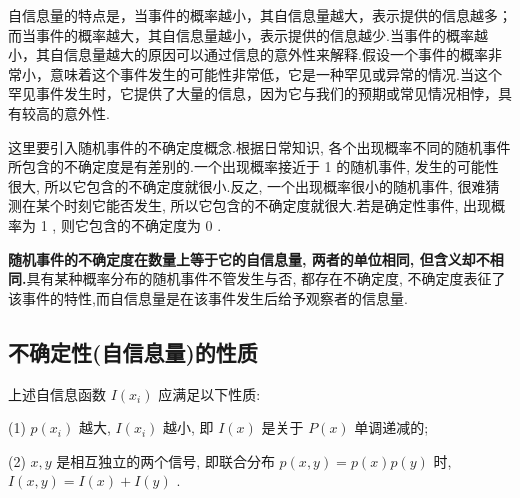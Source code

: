     自信息量的特点是，当事件的概率越小，其自信息量越大，表示提供的信息越多；而当事件的概率越大，其自信息量越小，表示提供的信息越少.当事件的概率越小，其自信息量越大的原因可以通过信息的意外性来解释.假设一个事件的概率非常小，意味着这个事件发生的可能性非常低，它是一种罕见或异常的情况.当这个罕见事件发生时，它提供了大量的信息，因为它与我们的预期或常见情况相悖，具有较高的意外性.


这里要引入随机事件的不确定度概念.根据日常知识, 各个出现概率不同的随机事件所包含的不确定度是有差别的.一个出现概率接近于 1 的随机事件, 发生的可能性很大, 所以它包含的不确定度就很小.反之, 一个出现概率很小的随机事件, 很难猜测在某个时刻它能否发生, 所以它包含的不确定度就很大.若是确定性事件, 出现概率为 1 , 则它包含的不确定度为 0 .

\begin{remark}
   \textbf{ 随机事件的不确定度在数量上等于它的自信息量, 两者的单位相同, 但含义却不相同.}具有某种概率分布的随机事件不管发生与否, 都存在不确定度, 不确定度表征了该事件的特性,而自信息量是在该事件发生后给予观察者的信息量.
\end{remark}
 
\subsection{不确定性(自信息量)的性质}

上述自信息函数 $ I\left(x_{i}\right) $ 应满足以下性质:

(1) $ p\left(x_{i}\right) $ 越大, $ I\left(x_{i}\right) $ 越小, 即 $ I(x) $ 是关于 $ P(x) $ 单调递减的;

(2) $ x, y $ 是相互独立的两个信号, 即联合分布 $ p(x, y)=p(x) p(y) $ 时,$ I(x, y)=I(x)+I(y) $ .

